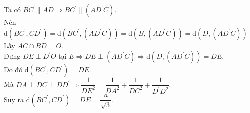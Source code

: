\begin{ex}
{\begin{itemchoice}
			\itemch Ta có $B C^{\prime}\parallel A D \Rightarrow B  C^{\prime}\parallel\left(A D^{\prime} C\right)$.\\
			Nên  $\mathrm{d}\left(B C^{\prime}, C D^{\prime}\right)=\mathrm{d}\left(B C^{\prime},\left(A D^{\prime} C\right)\right)=\mathrm{d}\left(B,\left(A D^{\prime} C\right)\right)=\mathrm{d}\left(D,\left(A D^{\prime} C\right)\right)$\\
			Lấy $A C \cap B D=O$.\\ Dựng $D E \perp D^{\prime} O$ tại $E \Rightarrow D E \perp\left(A D^{\prime} C\right) \Rightarrow \mathrm{d}\left(D,\left(A  D^{\prime} C\right)\right)=D E$.\\
			Do đó $\mathrm{d}\left(B C^{\prime}, C D^{\prime}\right)=D E$.\\ 
			Mà $D A \perp  D C \perp D D^{\prime} \Rightarrow \dfrac{1}{D E^{2}}=\dfrac{1}{D A^{2}}+\dfrac{1}{D C^{2}}+\dfrac{1}{D^{\prime} D^{2}}$.\\
			Suy ra $\mathrm{d}\left(B C^{\prime},  C D^{\prime}\right)=D E=\dfrac{a}{\sqrt{3}}$.
		\end{itemchoice}
	} 
\end{ex}

